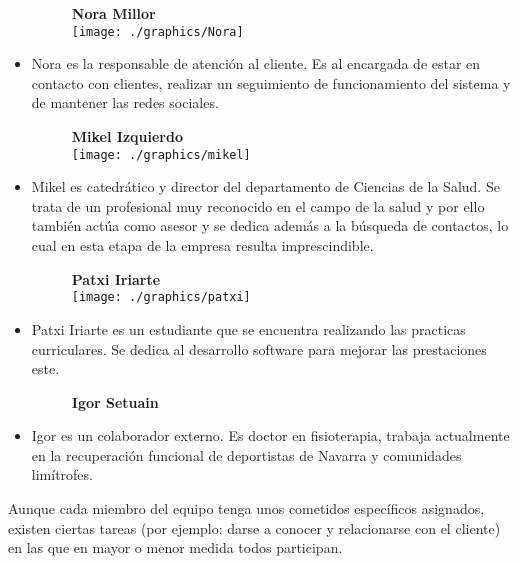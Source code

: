 \begin{itemize}
			\begin{figure}[H]
				\centering
				{\large \textbf{Nora Millor}\\}\smallskip
				\texttt{[image: ./graphics/Nora]}	
			\end{figure}
			\item Nora es la responsable de atención al cliente. Es al encargada de estar en contacto con clientes, realizar un seguimiento de funcionamiento del sistema y de mantener las redes sociales. \\
			\bigskip
			
			
			\begin{figure}[H]
				\centering
				{\large \textbf{Mikel Izquierdo}\\}\smallskip
				\texttt{[image: ./graphics/mikel]}	
			\end{figure}
			\item Mikel es catedrático y director del departamento de Ciencias de la Salud. Se trata de un profesional muy reconocido en el campo de la salud y por ello también actúa como asesor y se dedica además a la búsqueda de contactos, lo cual en esta etapa de la empresa resulta imprescindible.\\
			\bigskip
			
			\begin{figure}[H]
				\centering
				{\large \textbf{Patxi Iriarte}\\}\smallskip
				\texttt{[image: ./graphics/patxi]}	
			\end{figure}
			\item Patxi Iriarte es un estudiante que se encuentra realizando las practicas curriculares. Se dedica al desarrollo software para mejorar las prestaciones este.\\
			\bigskip
			
			\begin{figure}[H]
				\centering
				{\large \textbf{Igor Setuain}\\}\smallskip
				
			\end{figure}
			\item Igor es un colaborador externo. Es doctor en fisioterapia, trabaja actualmente en la recuperación funcional de deportistas de Navarra y comunidades limítrofes.\\
			
		\end{itemize}
		\bigskip
	
	Aunque cada miembro del equipo tenga unos cometidos específicos asignados, existen ciertas tareas (por ejemplo: darse a conocer y relacionarse con el cliente) en las que en mayor o menor medida todos participan.
	
